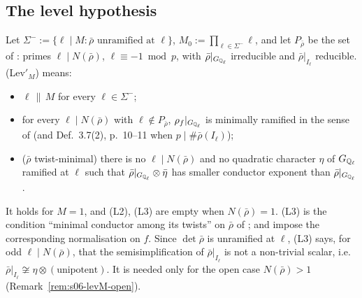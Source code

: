 \subsection{The level hypothesis}

\begin{hypothesis}\label{hyp:s06-levMp}
Let $\Sigma^-:=\{\ell\mid M:\bar\rho\text{ unramified at }\ell\}$, $M_0:=\prod_{\ell\in\Sigma^-}\ell$, and let $P_{\bar\rho}$ be the set of
\cite[(2.1), p.~3]{KO}: primes $\ell\mid N(\bar\rho)$, $\ell\equiv-1\bmod p$, with $\bar\rho|_{G_{\mathbb{Q}_\ell}}$ irreducible and $\bar\rho|_{I_\ell}$ reducible.
(Lev$'_M$) means:
\begin{itemize}
\item[(L1)] $\ell\,\|\,M$ for every $\ell\in\Sigma^-$;
\item[(L2)] for every $\ell\mid N(\bar\rho)$ with $\ell\notin P_{\bar\rho}$, $\rho_f|_{G_{\mathbb{Q}_\ell}}$ is minimally ramified in the sense of
  \cite[Def.~3.5, p.~10]{KO} (and Def.~3.7(2), p.~10--11 when $p\mid\#\bar\rho(I_\ell)$);
\item[(L3)] ($\bar\rho$ twist-minimal) there is no $\ell\mid N(\bar\rho)$ and no quadratic character $\eta$ of $G_{\mathbb{Q}_\ell}$ ramified at $\ell$ such that
  $\bar\rho|_{G_{\mathbb{Q}_\ell}}\otimes\bar\eta$ has smaller conductor exponent than $\bar\rho|_{G_{\mathbb{Q}_\ell}}$.
\end{itemize}
It holds for $M=1$, and (L2), (L3) are empty when $N(\bar\rho)=1$. (L3) is the condition ``minimal conductor among its twists'' on
$\bar\rho$ of \cite[\S3.1]{DFG}; \cite[Rem.~2.2, p.~3]{KO} and \cite[\S1.7.1]{DFG} impose the corresponding normalisation on $f$. Since
$\det\bar\rho$ is unramified at $\ell$, (L3) says, for odd $\ell\mid N(\bar\rho)$, that the semisimplification of $\bar\rho|_{I_\ell}$ is not a non-trivial scalar, i.e.\ $\bar\rho|_{I_\ell}\not\cong\eta\otimes(\text{unipotent})$. It is needed only for the open case $N(\bar\rho)>1$ (Remark~\ref{rem:s06-levM-open}). \sthyp

\end{hypothesis}

